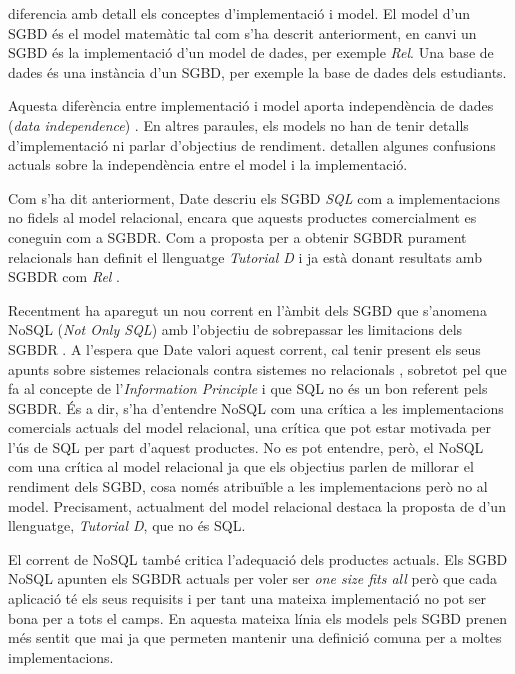 \textcite{date:introduction} diferencia amb detall els conceptes d'implementació i model.
El model d'un SGBD és el model matemàtic tal com s'ha descrit anteriorment, en canvi un SGBD és la implementació d'un model de dades, per exemple \emph{Rel}.
Una base de dades és una instància d'un SGBD, per exemple la base de dades dels estudiants.



Aquesta diferència entre implementació i model aporta independència de dades (\emph{data independence}) \parencite{date:dictionary}. En altres paraules, els models no han de tenir detalls d'implementació ni parlar d'objectius de rendiment. 
\textcite{dbdebunk} detallen algunes confusions actuals sobre la independència entre el model i la implementació.


Com s'ha dit anteriorment, Date descriu els SGBD \emph{SQL} com a implementacions no fidels al model relacional, encara que aquests productes comercialment es coneguin com a SGBDR. Com a proposta per a obtenir SGBDR purament relacionals \textcite{date06:_datab_types_relat_model,date:tutoriald} han definit el llenguatge \emph{Tutorial D} i ja està donant resultats amb SGBDR com \emph{Rel} .


Recentment ha aparegut un nou corrent en l'àmbit dels SGBD que s'anomena NoSQL (\emph{Not Only SQL}) amb l'objectiu de sobrepassar les limitacions dels SGBDR \parencite{edlich:nosql,stonebraker10}. 
A l'espera que Date valori aquest corrent, cal tenir present els seus apunts sobre sistemes relacionals contra sistemes no relacionals \parencite[part 7]{date06}, sobretot pel que fa al concepte de l'\emph{Information Principle} i que SQL no és un bon referent pels SGBDR. És a dir, s'ha d'entendre NoSQL com una crítica a les implementacions comercials actuals del model relacional, una crítica que pot estar motivada per l'ús de SQL per part d'aquest productes. 
No es pot entendre, però, el NoSQL com una crítica al model relacional ja que els objectius parlen de millorar el rendiment dels SGBD, cosa només atribuïble a les implementacions però no al model. Precisament, actualment del model relacional destaca la proposta de \citeauthor{date:tutoriald} d'un llenguatge, \emph{Tutorial D}, que no és SQL.


El corrent de NoSQL també critica l'adequació dels productes actuals.
Els SGBD NoSQL apunten els SGBDR actuals per voler ser \emph{one size fits all} \parencite{stonebraker07,stonebraker09} però que cada aplicació té els seus requisits i per tant una mateixa implementació no pot ser bona per a tots el camps.
En aquesta mateixa línia els models pels SGBD prenen més sentit que mai ja que permeten mantenir una definició comuna per a moltes implementacions.


